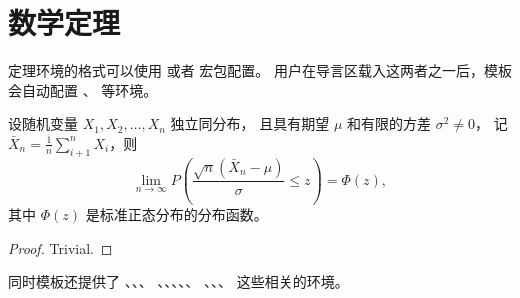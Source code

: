 \section{数学定理}

定理环境的格式可以使用  或者  宏包配置。
用户在导言区载入这两者之一后，模板会自动配置 、 等环境。

\begin{theorem}
  设随机变量 $X_1, X_2, \dots, X_n$ 独立同分布， 且具有期望 $\mu$ 和有限的方差 $\sigma^2 \ne 0$，
  记 $\bar{X}_n = \frac{1}{n} \sum_{i+1}^n X_i$，则
  \begin{equation}
    \lim_{n \to \infty} P \left(\frac{\sqrt{n} \left( \bar{X}_n - \mu \right)}{\sigma} \le z \right) = \Phi(z),
  \end{equation}
  其中 $\Phi(z)$ 是标准正态分布的分布函数。
\end{theorem}
\begin{proof}
  Trivial.
\end{proof}

同时模板还提供了 、、、
、、、、、
、、、 这些相关的环境。


\cleardoublepage
